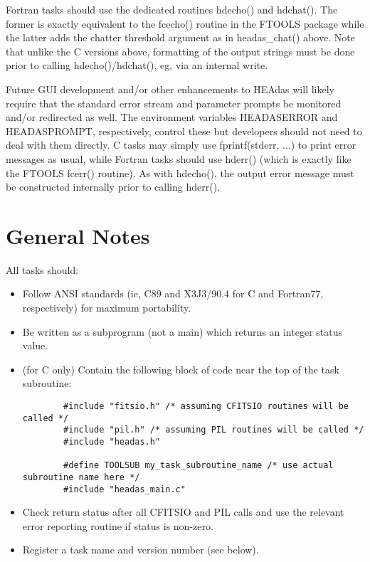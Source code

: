 \documentclass[11pt]{book}
\begin{document}
Fortran tasks should use the dedicated routines hdecho() and
hdchat(). The former is exactly equivalent to the fcecho()
routine in the FTOOLS package while the latter adds the chatter
threshold argument as in headas\_chat() above. Note that unlike
the C versions above, formatting of the output strings must be
done prior to calling hdecho()/hdchat(), eg, via an internal write.

Future GUI development and/or other enhancements to HEAdas
will likely require that the standard error stream and parameter
prompts be monitored and/or redirected as well. The environment
variables HEADASERROR and HEADASPROMPT,
respectively, control these but developers should not need to deal
with them directly. C tasks may simply use fprintf(stderr,
...) to print error messages as usual, while Fortran tasks should
use hderr() (which is exactly like the FTOOLS fcerr()
routine). As with hdecho(), the output error message must be
constructed internally prior to calling hderr().

\section{General Notes}
All tasks should:
\begin{itemize}

\item Follow ANSI standards (ie, C89 and X3J3/90.4 for C and
Fortran77, respectively) for maximum portability.

\item Be written as a subprogram (not a main) which returns an
integer status value.

\item (for C only) Contain the following block of code near the
top of the task subroutine:

\begin{verbatim}
        #include "fitsio.h" /* assuming CFITSIO routines will be called */
        #include "pil.h" /* assuming PIL routines will be called */
        #include "headas.h"

        #define TOOLSUB my_task_subroutine_name /* use actual subroutine name here */
        #include "headas_main.c"
\end{verbatim}

\item Check return status after all CFITSIO and PIL calls and
use the relevant error reporting routine if status is
non-zero.

\item Register a task name and version number (see below).

\end{itemize}
\end{document}
